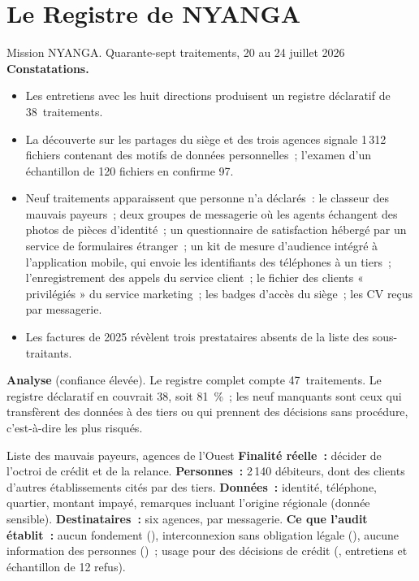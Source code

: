 \section{Le Registre de NYANGA}
\label{sec:c04-nyanga}

\begin{boxscenario}{Mission NYANGA. Quarante-sept traitements, 20 au 24 juillet 2026}
\textbf{Constatations.}
\begin{itemize}
    \item Les entretiens avec les huit directions produisent un registre
          déclaratif de 38~traitements.
    \item La découverte sur les partages du siège et des trois agences signale
          1\,312 fichiers contenant des motifs de données personnelles~;
          l'examen d'un échantillon de 120 fichiers en confirme 97.
    \item Neuf traitements apparaissent que personne n'a déclarés~: le
          classeur des mauvais payeurs~; deux groupes de messagerie où les
          agents échangent des photos de pièces d'identité~; un questionnaire
          de satisfaction hébergé par un service de formulaires étranger~; un
          kit de mesure d'audience intégré à l'application mobile, qui envoie
          les identifiants des téléphones à un tiers~; l'enregistrement des
          appels du service client~; le fichier des clients « privilégiés »
          du service marketing~; les badges d'accès du siège~; les CV reçus
          par messagerie.
    \item Les factures de 2025 révèlent trois prestataires absents de la
          liste des sous-traitants.
\end{itemize}

\textbf{Analyse} (confiance élevée). Le registre complet compte
47~traitements. Le registre déclaratif en couvrait 38, soit
81~\%~; les neuf manquants sont ceux qui transfèrent des données à des
tiers ou qui prennent des décisions sans procédure, c'est-à-dire les plus
risqués.
\end{boxscenario}

\begin{boxobjet}{Liste des mauvais payeurs, agences de l'Ouest}
\textbf{Finalité réelle~:} décider de l'octroi de crédit et de la relance.
\textbf{Personnes~:} 2\,140 débiteurs, dont des clients d'autres
établissements cités par des tiers. \textbf{Données~:} identité, téléphone,
quartier, montant impayé, remarques incluant l'origine régionale (donnée
sensible). \textbf{Destinataires~:} six agences, par messagerie.
\textbf{Ce que l'audit établit~:} aucun fondement (\NON{}), interconnexion
sans obligation légale (\NON{}), aucune information des personnes
(\NON{})~; usage pour des décisions de crédit (\OUI{}, entretiens et
échantillon de 12 refus).
\end{boxobjet}

